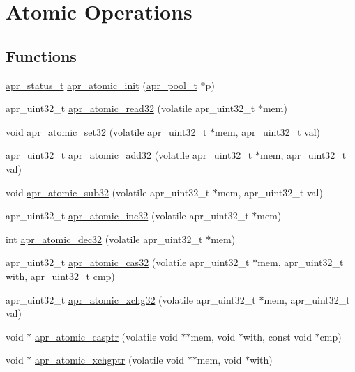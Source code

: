 \hypertarget{group__apr__atomic}{}\section{Atomic Operations}
\label{group__apr__atomic}
\subsection*{Functions}
\begin{DoxyCompactItemize}
\item 
\hyperlink{group__apr__errno_gaf76ee4543247e9fb3f3546203e590a6c}{apr\+\_\+status\+\_\+t} \hyperlink{group__apr__atomic_gaa89b4022de39ca4d1c2ae6715e888e97}{apr\+\_\+atomic\+\_\+init} (\hyperlink{group__apr__pools_gaf137f28edcf9a086cd6bc36c20d7cdfb}{apr\+\_\+pool\+\_\+t} $\ast$p)
\item 
apr\+\_\+uint32\+\_\+t \hyperlink{group__apr__atomic_gafba4de90e113d26536cff48418689771}{apr\+\_\+atomic\+\_\+read32} (volatile apr\+\_\+uint32\+\_\+t $\ast$mem)
\item 
void \hyperlink{group__apr__atomic_gac689de9df18c093f66959227359328bb}{apr\+\_\+atomic\+\_\+set32} (volatile apr\+\_\+uint32\+\_\+t $\ast$mem, apr\+\_\+uint32\+\_\+t val)
\item 
apr\+\_\+uint32\+\_\+t \hyperlink{group__apr__atomic_ga3ef16e13b679710fafd5196713e17433}{apr\+\_\+atomic\+\_\+add32} (volatile apr\+\_\+uint32\+\_\+t $\ast$mem, apr\+\_\+uint32\+\_\+t val)
\item 
void \hyperlink{group__apr__atomic_ga4603396650e844bd987f01358ccb4df1}{apr\+\_\+atomic\+\_\+sub32} (volatile apr\+\_\+uint32\+\_\+t $\ast$mem, apr\+\_\+uint32\+\_\+t val)
\item 
apr\+\_\+uint32\+\_\+t \hyperlink{group__apr__atomic_ga4af33da5aa6493ec321af14bedfc47a9}{apr\+\_\+atomic\+\_\+inc32} (volatile apr\+\_\+uint32\+\_\+t $\ast$mem)
\item 
int \hyperlink{group__apr__atomic_ga7a8d16335fdcd27f2baca90df35ad300}{apr\+\_\+atomic\+\_\+dec32} (volatile apr\+\_\+uint32\+\_\+t $\ast$mem)
\item 
apr\+\_\+uint32\+\_\+t \hyperlink{group__apr__atomic_gae45c529f14f8489102382bd3fd4cce22}{apr\+\_\+atomic\+\_\+cas32} (volatile apr\+\_\+uint32\+\_\+t $\ast$mem, apr\+\_\+uint32\+\_\+t with, apr\+\_\+uint32\+\_\+t cmp)
\item 
apr\+\_\+uint32\+\_\+t \hyperlink{group__apr__atomic_ga50850e462d65e0409d5a93a6b4ec26c6}{apr\+\_\+atomic\+\_\+xchg32} (volatile apr\+\_\+uint32\+\_\+t $\ast$mem, apr\+\_\+uint32\+\_\+t val)
\item 
void $\ast$ \hyperlink{group__apr__atomic_gafdd02b41cc39ade873daa2734597b0fa}{apr\+\_\+atomic\+\_\+casptr} (volatile void $\ast$$\ast$mem, void $\ast$with, const void $\ast$cmp)
\item 
void $\ast$ \hyperlink{group__apr__atomic_gaab4c1c5b8be70ded06dd31a1a4f65bf6}{apr\+\_\+atomic\+\_\+xchgptr} (volatile void $\ast$$\ast$mem, void $\ast$with)
\end{DoxyCompactItemize}



